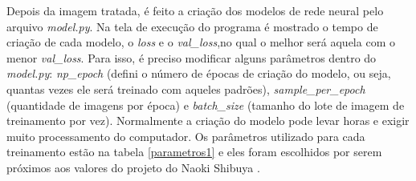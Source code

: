 	\begin{figure}[H]
		\centering
\end{figure}

Depois da imagem tratada, é feito a criação dos modelos de rede neural pelo arquivo \textit{model.py}. Na tela de execução do programa é mostrado o tempo de criação de cada modelo, o \textit{loss} e o \textit{val\_loss},no qual o melhor será aquela com o menor \textit{val\_loss}. Para isso, é preciso modificar alguns parâmetros dentro do \textit{model.py}: \textit{np\_epoch} (defini o número de épocas de criação do modelo, ou seja, quantas vezes ele será treinado com aqueles padrões), \textit{sample\_per\_epoch} (quantidade de imagens por época) e \textit{batch\_size} (tamanho do lote de imagem de treinamento por vez). Normalmente a criação do modelo pode levar horas e exigir muito processamento do computador. Os parâmetros utilizado para cada treinamento estão na tabela \ref{parametros1} e eles foram escolhidos por serem próximos aos valores do projeto do Naoki Shibuya \cite{naokish}.

